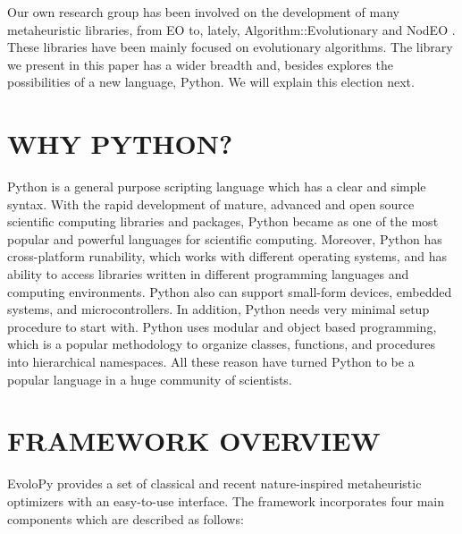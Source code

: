 \documentclass[a4paper,twoside]{article}
\begin{document}
Our own research group has been involved on the development of many
metaheuristic libraries, from EO \cite{EO:FEA2000} to, lately, {\sf
  Algorithm::Evolutionary} \cite{ae09} and NodEO
\cite{nodeo2014}. These libraries have been mainly focused on
evolutionary algorithms. The library we present in this paper has a
wider breadth and, besides explores the possibilities of a new
language, Python. We will explain this election next. 


\section{\uppercase{Why Python?}}

Python is a general purpose scripting language which has a clear and simple syntax. With the rapid development of mature, advanced  and open source scientific computing libraries and packages, Python became as one of the most popular and powerful languages for scientific computing.
Moreover, Python has cross-platform runability, which works with different operating systems, and has ability to access libraries written in different programming languages and computing environments. Python also can support small-form devices, embedded systems, and microcontrollers. In addition, Python needs very minimal setup procedure to start with. Python uses modular and object based programming, which is a popular methodology to organize classes, functions, and procedures into hierarchical namespaces. All these reason have turned Python to be a popular language in a huge community of scientists. 

\section{\uppercase{Framework Overview}}

EvoloPy provides a set of classical and recent nature-inspired metaheuristic optimizers with an easy-to-use interface. The framework incorporates four main components which are described as follows: 
\end{document}
